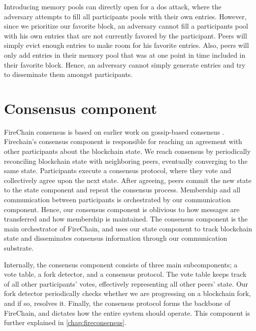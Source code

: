 \documentclass[USenglish]{uit-thesis}
\begin{document}
Introducing memory pools can directly open for a \gls{dos} attack, where the adversary attempts to fill all participants pools with their own entries.
However, since we prioritize our favorite block, an adversary cannot fill a participants pool with his own entries that are not currently favored by the participant.
Peers will simply evict enough entries to make room for his favorite entries.
Also, peers will only add entries in their memory pool that was at one point in time included in their favorite block.
Hence, an adversary cannot simply generate entries and try to disseminate them amongst participants.




\section{Consensus component}
FireChain consensus is based on earlier work on gossip-based consensus \cite{vanblock}.
Firechain's consensus component is responsible for reaching an agreement with other participants about the blockchain state.
We reach consensus by periodically reconciling blockchain state with neighboring peers, eventually converging to the same state.
Participants execute a consensus protocol, where they vote and collectively agree upon the next state.
After agreeing, peers commit the new state to the state component and repeat the consensus process. 
Membership and all communication between participants is orchestrated by our communication component.
Hence, our consensus component is oblivious to how messages are transferred and how membership is maintained.
The consensus component is the main orchestrator of FireChain, and uses our state component to track blockchain state and disseminates consensus information through our communication substrate. 

Internally, the consensus component consists of three main subcomponents; a vote table, a fork detector, and a consensus protocol.
The vote table keeps track of all other participants' votes, effectively representing all other peers' state.
Our fork detector periodically checks whether we are progressing on a blockchain fork, and if so, resolves it.
Finally, the consensus protocol forms the backbone of FireChain, and dictates how the entire system should operate.
This component is further explained in \autoref{chap:fireconsensus}.
\end{document}
